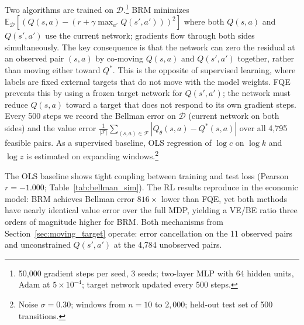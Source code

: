 Two algorithms are trained on $\mathcal{D}$.\footnote{50,000 gradient steps per seed, 3 seeds; two-layer MLP with 64 hidden units, Adam at $5 \times 10^{-4}$; target network updated every 500 steps.} BRM minimizes $\mathbb{E}_\mathcal{D}[(Q(s,a) - (r + \gamma \max_{a'} Q(s',a')))^2]$ where both $Q(s,a)$ and $Q(s',a')$ use the current network; gradients flow through both sides simultaneously. The key consequence is that the network can zero the residual at an observed pair $(s,a)$ by co-moving $Q(s,a)$ and $Q(s',a')$ together, rather than moving either toward $Q^*$. This is the opposite of supervised learning, where labels are fixed external targets that do not move with the model weights. FQE prevents this by using a frozen target network for $Q(s',a')$; the network must reduce $Q(s,a)$ toward a target that does not respond to its own gradient steps. Every 500 steps we record the Bellman error on $\mathcal{D}$ (current network on both sides) and the value error $\frac{1}{|\mathcal{F}|}\sum_{(s,a)\in\mathcal{F}}|Q_\theta(s,a) - Q^*(s,a)|$ over all 4,795 feasible pairs. As a supervised baseline, OLS regression of $\log c$ on $\log k$ and $\log z$ is estimated on expanding windows.\footnote{Noise $\sigma = 0.30$; windows from $n = 10$ to $2{,}000$; held-out test set of 500 transitions.}

The OLS baseline shows tight coupling between training and test loss (Pearson $r = -1.000$; Table~\ref{tab:bellman_sim}). The RL results reproduce \citet{Fujimoto2022} in the economic model: BRM achieves Bellman error $816\times$ lower than FQE, yet both methods have nearly identical value error over the full MDP, yielding a VE/BE ratio three orders of magnitude higher for BRM. Both mechanisms from Section~\ref{sec:moving_target} operate: error cancellation on the 11 observed pairs and unconstrained $Q(s',a')$ at the 4,784 unobserved pairs.

